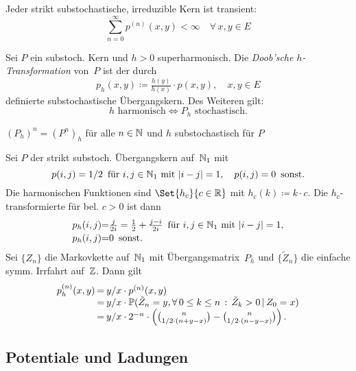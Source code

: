 \documentclass{cheat-sheet}
\renewcommand{\P}{\mathbb{P}} %
\begin{document}
\begin{bem}
  Jeder strikt substochastische, irreduzible Kern ist transient:
  \[
    {\sum}_{n=0}^\infty p^{(n)}(x, y) < \infty \quad
    \forall \, x, y \in E
  \]
\end{bem}

\begin{lemdefn}
  Sei $P$ ein substoch. Kern und $h > 0$ superharmonisch.
  Die \emph{Doob'sche $h$-Transformation} von~$P$ ist der durch
  \[
    p_h(x, y) \coloneqq \tfrac{h(y)}{h(x)} \cdot p(x, y), \quad
    x, y \in E
  \]
  definierte substochastische Übergangskern.
  Des Weiteren gilt:
  \[
    h \text{ harmonisch} \iff P_h \text{ stochastisch}.
  \]
\end{lemdefn}

\begin{lem}
  $(P_h)^n = (P^n)_h$ für alle $n \in \mathbb{N}$ und $h$ substochastisch für $P$
\end{lem}

\begin{bsp}
  Sei $P$ der strikt substoch. Übergangskern auf~$\mathbb{N}_1$ mit
  \[
    p(i, j) = 1/2 \enspace \text{für $i, j \in \mathbb{N}_1$ mit $\lvert i - j\rvert = 1$}, \quad
    p(i, j) = 0 \enspace \text{sonst.}
  \]
  Die harmonischen Funktionen sind $\Set{h_c}{c \in \R}$ mit $h_c(k) \coloneqq k \cdot c$.
  Die $h_c$-transformierte für bel. $c > 0$ ist dann
  \[
    \arraycolsep=0pt
    \begin{array}{r c l}
      p_h(i, j) &=& \tfrac{j}{2i} = \tfrac{1}{2} + \tfrac{j - i}{2i} \enspace \text{für $i, j \in \N_1$ mit $\abs{i - j} = 1$}, \\[0.2em]
      p_h(i, j) &=& 0 \enspace \text{sonst.}
    \end{array}
  \]
  Sei $\{ Z_n \}$ die Markovkette auf~$\mathbb{N}_1$ mit Übergangsmatrix~$P_h$ und $\{ \tilde{Z}_n \}$ die einfache symm. Irrfahrt auf~$\mathbb{Z}$.
  Dann gilt
  \[
    \arraycolsep=1pt
    \begin{array}{r c l}
      p_h^{(n)}(x, y)
        &=& y/x \cdot p^{(n)}(x, y) \\
        &=& y/x \cdot \P(\tilde{Z}_n = y, \fa{0 \leq k \leq n} \tilde{Z}_k > 0 \,|\, Z_0 = x) \\
        &=& y/x \cdot 2^{-n} \cdot \left( \binom{n}{1/2 \cdot (n + y - x)} - \binom{n}{1/2 \cdot (n - y - x)} \right).
    \end{array}
  \]
\end{bsp}

\subsection{Potentiale und Ladungen}
\end{document}
